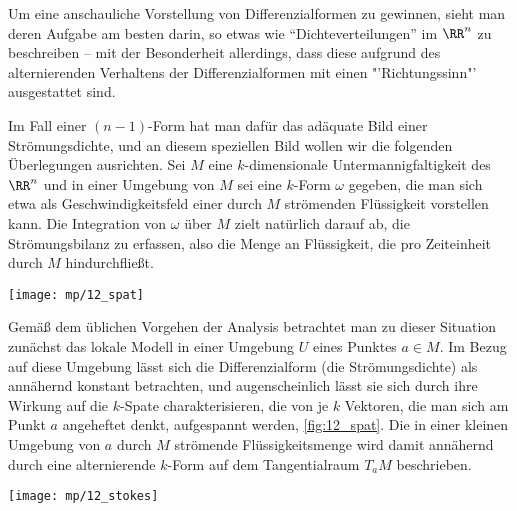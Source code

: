 \begin{antwort}
  Um eine anschauliche Vorstellung von Differenzialformen zu gewinnen, 
  sieht man deren Aufgabe am besten darin, so etwas wie 
  "`Dichteverteilungen"' im $\RR^n$ zu beschreiben -- mit der 
  Besonderheit allerdings, dass diese aufgrund des alternierenden 
  Verhaltens der Differenzialformen mit einen "'Richtungssinn"' 
  ausgestattet sind. 

  Im Fall einer $(n-1)$-Form hat man dafür das adäquate Bild 
  einer Strömungsdichte, und an diesem speziellen Bild wollen wir die 
  folgenden Überlegungen ausrichten. Sei $M$ eine 
  $k$-dimensionale Untermannigfaltigkeit des $\RR^n$ und in einer Umgebung 
  von $M$ sei eine $k$-Form $\omega$ gegeben, die man sich etwa  
  als Geschwindigkeitsfeld einer durch $M$ strömenden Flüssigkeit 
  vorstellen kann. Die Integration von $\omega$ über $M$ zielt 
  natürlich darauf ab, die Strömungsbilanz zu erfassen, also die Menge an 
  Flüssigkeit, die pro Zeiteinheit durch $M$ hindurchfließt.   

  \begin{center}
    \texttt{[image: mp/12\_spat]}
    \label{fig:12_spat}
  \end{center}
  
  Gemäß dem üblichen Vorgehen der Analysis betrachtet man 
  zu dieser Situation zunächst das lokale Modell in einer 
  Umgebung $U$ eines Punktes $a\in M$. Im Bezug auf diese Umgebung 
  lässt sich die Differenzialform (die Strömungsdichte) als annähernd 
  konstant betrachten, und augenscheinlich lässt sie sich  
  durch ihre Wirkung auf die $k$-Spate charakterisieren, 
  die von je $k$ Vektoren, die man sich am Punkt $a$ angeheftet denkt, 
  aufgespannt werden, \sieheAbbildung\ref{fig:12_spat}. 
  Die in einer kleinen Umgebung von $a$ durch 
  $M$ strömende Flüssigkeitsmenge wird damit annähernd durch eine 
  alternierende $k$-Form auf dem Tangentialraum $T_a M$ beschrieben.    

  
  \begin{center}
    \texttt{[image: mp/12\_stokes]}
    \label{fig:12_stokes}
  \end{center}


\end{antwort}

